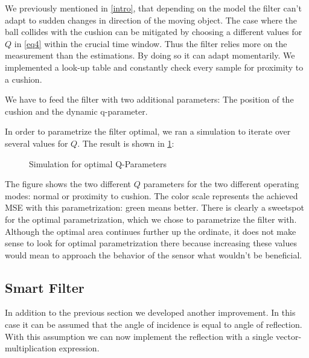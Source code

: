 \documentclass[notitlepage, a4paper, 11pt]{scrartcl}
\begin{document}
\begin{multicols}{2}
We previously mentioned in \cref{intro}, that depending on the model the filter can't adapt to sudden changes in direction of the moving object. 
The case where the ball collides with the cushion can be mitigated by choosing a different values for $Q$ in \cref{eq4} within the crucial time window.
Thus the filter relies more on the measurement than the estimations. By doing so it can adapt momentarily.
We implemented a look-up table and constantly check every sample for proximity to a cushion.

We have to feed the filter with two additional parameters: The position of the cushion and the dynamic q-parameter.

In order to parametrize the filter optimal, we ran a simulation to iterate over several values for $Q$. The result is shown in \cref{fig:dyn-sim}:

\begin{figure} [H]
    \centering
    \caption{Simulation for optimal Q-Parameters}
    \label{fig:dyn-sim}
\end{figure}

The figure shows the two different $Q$ parameters for the two different operating modes: normal or proximity to cushion. 
The color scale represents the achieved MSE with this parametrization: green means better.
There is clearly a sweetspot for the optimal parametrization, which we chose to parametrize the filter with.
Although the optimal area continues further up the ordinate, it does not make sense to look for optimal parametrization there
because increasing these values would mean to approach the behavior of the sensor what wouldn't be beneficial.

\subsection{Smart Filter} \label{smart-filter}

In addition to the previous section we developed another improvement. In this case it can be assumed that the angle of incidence is equal to angle of reflection. 
With this assumption we can now implement the reflection with a single vector-multiplication expression. 


\end{multicols}
\end{document}
